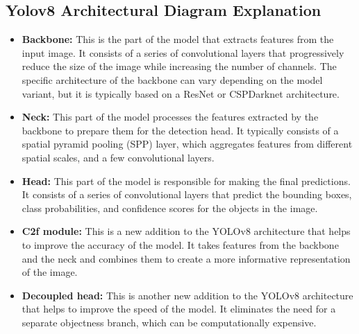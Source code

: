 \documentclass[12 pt]{report}
\begin{document}
\subsection{Yolov8 Architectural Diagram Explanation}
{
  \begin{justify}
  \begin{itemize}
    \item \textbf{Backbone:} This is the part of the model that extracts features from the input image. It consists of a series of convolutional layers that progressively reduce the size of the image while increasing the number of channels. The specific architecture of the backbone can vary depending on the model variant, but it is typically based on a ResNet or CSPDarknet architecture.

    \item \textbf{Neck:} This part of the model processes the features extracted by the backbone to prepare them for the detection head. It typically consists of a spatial pyramid pooling (SPP) layer, which aggregates features from different spatial scales, and a few convolutional layers.

    \item \textbf{Head:} This part of the model is responsible for making the final predictions. It consists of a series of convolutional layers that predict the bounding boxes, class probabilities, and confidence scores for the objects in the image.

    \item \textbf{C2f module:} This is a new addition to the YOLOv8 architecture that helps to improve the accuracy of the model. It takes features from the backbone and the neck and combines them to create a more informative representation of the image.

    \item \textbf{Decoupled head:} This is another new addition to the YOLOv8 architecture that helps to improve the speed of the model. It eliminates the need for a separate objectness branch, which can be computationally expensive.
  \end{itemize}
  \end{justify}
}

%
%
\end{document}
